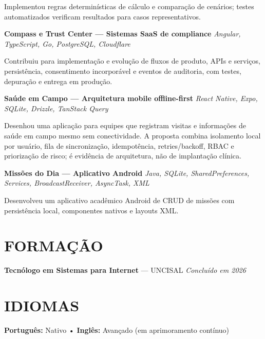 \documentclass[10pt,a4paper]{article}
\begin{document}
\footnotesize

Implementou regras determinísticas de cálculo e comparação de cenários; testes automatizados verificam resultados para casos representativos.

\vspace{0.5pt}

\noindent
\textbf{Compass e Trust Center — Sistemas SaaS de compliance}
\hfill
\textit{Angular, TypeScript, Go, PostgreSQL, Cloudflare}

\footnotesize

Contribuiu para implementação e evolução de fluxos de produto, APIs e serviços, persistência, consentimento incorporável e eventos de auditoria, com testes, depuração e entrega em produção.

\vspace{0.5pt}

\noindent
\textbf{Saúde em Campo — Arquitetura mobile offline-first}
\hfill
\textit{React Native, Expo, SQLite, Drizzle, TanStack Query}

\footnotesize

Desenhou uma aplicação para equipes que registram visitas e informações de saúde em campo mesmo sem conectividade. A proposta combina isolamento local por usuário, fila de sincronização, idempotência, retries/backoff, RBAC e priorização de risco; é evidência de arquitetura, não de implantação clínica.

\vspace{0.5pt}

\noindent
\textbf{Missões do Dia — Aplicativo Android}
\hfill
\textit{Java, SQLite, SharedPreferences, Services, BroadcastReceiver, AsyncTask, XML}

\footnotesize

Desenvolveu um aplicativo acadêmico Android de CRUD de missões com persistência local, componentes nativos e layouts XML.


\section*{FORMAÇÃO}

\noindent
\textbf{Tecnólogo em Sistemas para Internet} — UNCISAL
\hfill
\textit{Concluído em 2026}


\vspace{-2pt}
\section*{IDIOMAS}

\noindent
\textbf{Português:} Nativo
\quad • \quad
\textbf{Inglês:} Avançado (em aprimoramento contínuo)
\end{document}
